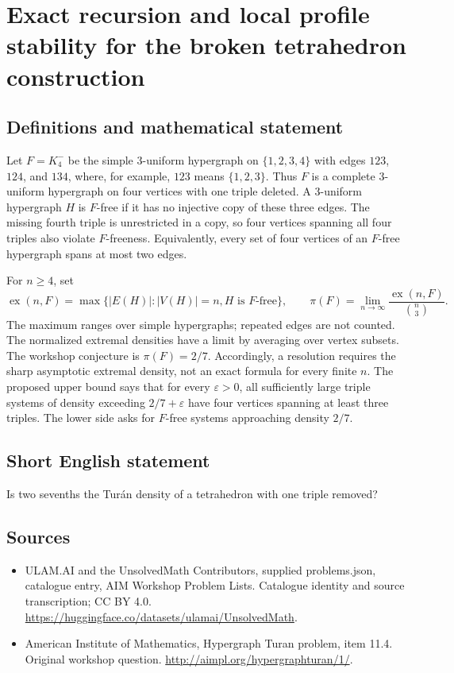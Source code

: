 \documentclass[11pt,a4paper]{article}
\begin{document}
\section*{Exact recursion and local profile stability for the broken tetrahedron construction}\label{statement}

\subsection{Definitions and mathematical statement}
Let $F=K_4^-$ be the simple $3$-uniform hypergraph on $\{1,2,3,4\}$
with edges $123$, $124$, and $134$, where, for example, $123$ means
$\{1,2,3\}$. Thus $F$ is a complete $3$-uniform hypergraph on four
vertices with one triple deleted.
A $3$-uniform hypergraph $H$ is $F$-free if it has no injective copy
of these three edges. The missing fourth triple is unrestricted in
a copy, so four vertices spanning all four triples also violate
$F$-freeness. Equivalently, every set of four vertices of an $F$-free
hypergraph spans at most two edges.

For $n\ge4$, set
\[
 \operatorname{ex}(n,F)=\max\{|E(H)|:|V(H)|=n, H\text{ is }F\text{-free}\},
 \qquad
 \pi(F)=\lim_{n\to\infty}\frac{\operatorname{ex}(n,F)}{\binom n3}.
\]
The maximum ranges over simple hypergraphs; repeated edges are not
counted. The normalized extremal densities have a limit by averaging
over vertex subsets.
The workshop conjecture is $\pi(F)=2/7$. Accordingly, a resolution
requires the sharp asymptotic extremal density, not an exact formula
for every finite $n$. The proposed upper bound says that for every
$\varepsilon>0$, all sufficiently large triple systems of density
exceeding $2/7+\varepsilon$ have four vertices spanning at least three
triples. The lower side asks for $F$-free systems approaching density
$2/7$.
\subsection{Short English statement}
Is two sevenths the Turán density of a tetrahedron with one triple removed?
\subsection{Sources}
\begin{itemize}
\item[S1] ULAM.AI and the UnsolvedMath Contributors, supplied problems.json, catalogue entry, AIM Workshop Problem Lists. Catalogue identity and source transcription; CC BY 4.0.
\url{https://huggingface.co/datasets/ulamai/UnsolvedMath}.
\item[S2] American Institute of Mathematics, Hypergraph Turan problem, item 11.4. Original workshop question.
\url{http://aimpl.org/hypergraphturan/1/}.
\end{itemize}
\end{document}

